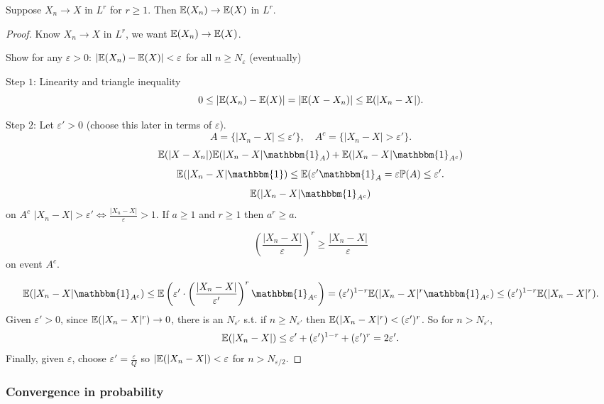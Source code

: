 \documentclass[10pt, a4paper]{article}
\begin{document}
\begin{proposition}
    Suppose $X_n \to X$ in $L ^ r$ for $r \geq 1$.
    Then $\mathbb{E}(X_n) \to \mathbb{E}(X)$ in $L ^ r$.

    \begin{proof}
        Know $X_n \to X$ in $L ^ r$,
        we want $\mathbb{E}(X_n) \to \mathbb{E}(X)$.

        Show for any $\varepsilon > 0$:
        $|\mathbb{E}(X_n) - \mathbb{E}(X)| < \varepsilon$ for all $n \geq N_{\varepsilon}$
        (eventually)

        Step $1$:
        Linearity and triangle inequality
        \[
        0 \leq |\mathbb{E}(X_n) - \mathbb{E}(X)| = |\mathbb{E}(X - X_n)| \leq \mathbb{E}(|X_n - X|).
        \]

        Step $2$:
        Let $\varepsilon' > 0$
        (choose this later in terms of $\varepsilon$).
        \[
        A = \{|X_n - X| \leq \varepsilon'\},\quad A ^ c = \{|X_n - X| > \varepsilon'\}.
        \]
        \[
        \E(|X - X_n|) \E(|X_n - X|\mathbbm{1}_{A}) + \E(|X_n - X|\mathbbm{1}_{A ^ c})
        \]
    	\[
    	\E(|X_n - X|\mathbbm{1}) \leq \E(\varepsilon'\mathbbm{1}_A 	= \varepsilon\P(A) \leq \varepsilon'.
    	\]
        \[
        \E(|X_n - X|\mathbbm{1}_{A ^ c})
        \]
        on $A ^ c$ $|X_n - X| > \varepsilon' \iff \frac{|X_n - X|}{\varepsilon} > 1$.
        If $a \geq 1$ and $r \geq 1$ then $a ^ r \geq a$.

        \[
        \left(\frac{|X_n - X|}{\varepsilon}\right) ^ r \geq \frac{|X_n - X|}{\varepsilon}
        \]
        on event $A ^ c$.

        \[
        \E(|X_n - X|\mathbbm{1}_{A ^ c}) \leq \E\left(\varepsilon'\cdot\left(\frac{|X_n - X|}{\varepsilon'}\right) ^ r\mathbbm{1}_{A ^ c}\right) = (\varepsilon') ^ {1 - r}\E(|X_n - X| ^ r\mathbbm{1}_{A ^ c}) \leq (\varepsilon') ^ {1 - r}\E(|X_n - X| ^ r).
        \]
        Given $\varepsilon' > 0$,
        since $\mathbb{E}(|X_n - X| ^ r) \to 0$,
        there is an $N_{\varepsilon'}$ s.t. if $n \geq N_{\varepsilon'}$ then $\mathbb{E}(|X_n - X| ^ r) < (\varepsilon') ^ {r}$.
        So for $n > N_{\varepsilon'}$,
        \[
        \mathbb{E}(|X_n - X|) \leq \varepsilon' + (\varepsilon') ^ {1 - r} + (\varepsilon') ^ {r} = 2\varepsilon'.
        \]
        Finally,
        given $\varepsilon$,
        choose $\varepsilon' = \frac{\varepsilon}{Q}$ so $|\mathbb{E}(|X_n - X|) < \varepsilon$ for $n > N_{\varepsilon / 2}$.
    \end{proof}
\end{proposition}

\subsubsection{Convergence in probability}
\end{document}
